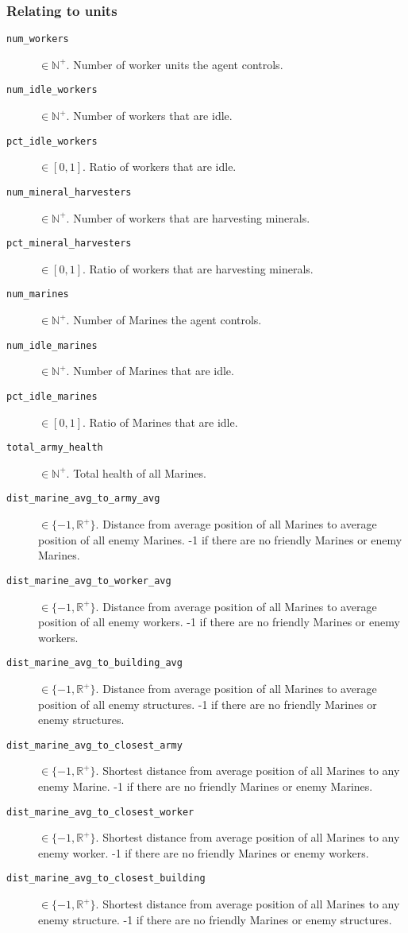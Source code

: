 \subsubsection*{Relating to units}
\begin{description}
    \item[\texttt{num\_workers}] $\in \mathbb{N}^+$. Number of worker units the agent controls.
    \item[\texttt{num\_idle\_workers}] $\in \mathbb{N}^+$. Number of workers that are idle.
    \item[\texttt{pct\_idle\_workers}] $\in [0,1]$. Ratio of workers that are idle.
    \item[\texttt{num\_mineral\_harvesters}] $\in \mathbb{N}^+$. Number of workers that are harvesting minerals.
    \item[\texttt{pct\_mineral\_harvesters}] $\in [0,1]$. Ratio of workers that are harvesting minerals.
    \item[\texttt{num\_marines}] $\in \mathbb{N}^+$. Number of Marines the agent controls.
    \item[\texttt{num\_idle\_marines}] $\in \mathbb{N}^+$. Number of Marines that are idle.
    \item[\texttt{pct\_idle\_marines}] $\in [0,1]$. Ratio of Marines that are idle.
    \item[\texttt{total\_army\_health}] $\in \mathbb{N}^+$. Total health of all Marines.
    \item[\texttt{dist\_marine\_avg\_to\_army\_avg}] $\in \{-1, \mathbb{R}^+\}$. Distance from average position of all Marines to average position of all enemy Marines. -1 if there are no friendly Marines or enemy Marines.
    \item[\texttt{dist\_marine\_avg\_to\_worker\_avg}] $\in \{-1, \mathbb{R}^+\}$. Distance from average position of all Marines to average position of all enemy workers. -1 if there are no friendly Marines or enemy workers.
    \item[\texttt{dist\_marine\_avg\_to\_building\_avg}] $\in \{-1, \mathbb{R}^+\}$. Distance from average position of all Marines to average position of all enemy structures. -1 if there are no friendly Marines or enemy structures.
    \item[\texttt{dist\_marine\_avg\_to\_closest\_army}] $\in \{-1, \mathbb{R}^+\}$. Shortest distance from average position of all Marines to any enemy Marine. -1 if there are no friendly Marines or enemy Marines.
    \item[\texttt{dist\_marine\_avg\_to\_closest\_worker}] $\in \{-1, \mathbb{R}^+\}$. Shortest distance from average position of all Marines to any enemy worker. -1 if there are no friendly Marines or enemy workers.
    \item[\texttt{dist\_marine\_avg\_to\_closest\_building}] $\in \{-1, \mathbb{R}^+\}$. Shortest distance from average position of all Marines to any enemy structure. -1 if there are no friendly Marines or enemy structures.
\end{description}

